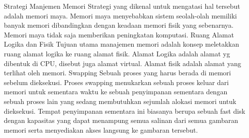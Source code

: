 Strategi Manjemen Memori
Strategi yang dikenal untuk mengatasi hal tersebut adalah memori maya. Memori maya menyebabkan sistem seolah-olah memiliki banyak memori dibandingkan dengan keadaan memori fisik yang sebenarnya. Memori maya tidak saja memberikan peningkatan komputasi.
Ruang Alamat Logika dan Fisik
Tujuan utama manajemen memori adalah konsep meletakkan ruang alamat logika ke ruang alamat fisik. Alamat Logika adalah alamat yg dibentuk di CPU, disebut juga alamat virtual. Alamat fisik adalah alamat yang terlihat oleh memori.
Swapping
Sebuah proses yang harus berada di memori sebelum dieksekusi. Proses swapping menukarkan sebuah proses keluar dari memori untuk sementara waktu ke sebuah penyimpanan sementara dengan sebuah proses lain yang sedang membutuhkan sejumlah alokasi memori untuk dieksekusi. Tempat penyimpanan sementara ini biasanya berupa sebuah fast disk dengan kapasitas yang dapat menampung semua salinan dari semua gambaran memori serta menyediakan akses langsung ke gambaran tersebut.



